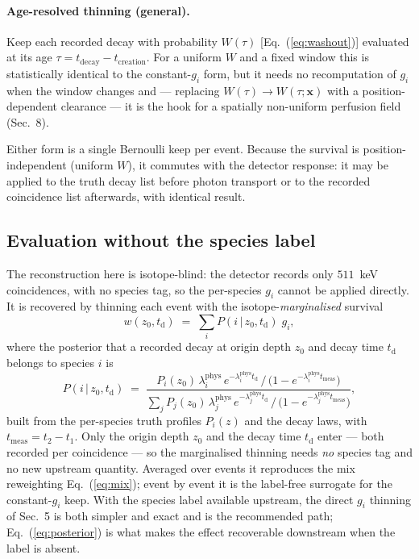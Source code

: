 \documentclass[11pt]{article}
\begin{document}
\paragraph{Age-resolved thinning (general).}
Keep each recorded decay with probability $W(\tau)$ [Eq.~(\ref{eq:washout})]
evaluated at its age $\tau=t_{\mathrm{decay}}-t_{\mathrm{creation}}$. For a uniform
$W$ and a fixed window this is statistically identical to the constant-$g_i$ form,
but it needs no recomputation of $g_i$ when the window changes and ---
replacing $W(\tau)\to W(\tau;\mathbf{x})$ with a position-dependent clearance ---
it is the hook for a spatially non-uniform perfusion field (Sec.~8).

Either form is a single Bernoulli keep per event. Because the survival is
position-independent (uniform $W$), it commutes with the detector response: it may
be applied to the truth decay list before photon transport or to the recorded
coincidence list afterwards, with identical result.

\subsection*{Evaluation without the species label}

The reconstruction here is isotope-blind: the detector records only $511$~keV
coincidences, with no species tag, so the per-species $g_i$ cannot be applied
directly. It is recovered by thinning each event with the
isotope-\emph{marginalised} survival
%
\begin{equation}
  w(z_0,t_{\mathrm{d}}) \;=\; \sum_i P(i\,|\,z_0,t_{\mathrm{d}})\; g_i,
  \label{eq:wmarg}
\end{equation}
%
where the posterior that a recorded decay at origin depth $z_0$ and decay time
$t_{\mathrm{d}}$ belongs to species $i$ is
%
\begin{equation}
  P(i\,|\,z_0,t_{\mathrm{d}}) \;=\;
  \frac{P_i(z_0)\,\lambda_i^{\mathrm{phys}}\,
        e^{-\lambda_i^{\mathrm{phys}} t_{\mathrm{d}}}\,\big/\,
        \bigl(1-e^{-\lambda_i^{\mathrm{phys}} t_{\mathrm{meas}}}\bigr)}
       {\sum_j P_j(z_0)\,\lambda_j^{\mathrm{phys}}\,
        e^{-\lambda_j^{\mathrm{phys}} t_{\mathrm{d}}}\,\big/\,
        \bigl(1-e^{-\lambda_j^{\mathrm{phys}} t_{\mathrm{meas}}}\bigr)},
  \label{eq:posterior}
\end{equation}
%
built from the per-species truth profiles $P_i(z)$ and the decay laws, with
$t_{\mathrm{meas}}=t_2-t_1$. Only the origin depth $z_0$ and the decay time
$t_{\mathrm{d}}$ enter --- both recorded per coincidence --- so the marginalised
thinning needs \emph{no} species tag and no new upstream quantity. Averaged over
events it reproduces the mix reweighting Eq.~(\ref{eq:mix}); event by event it is
the label-free surrogate for the constant-$g_i$ keep. With the species label
available upstream, the direct $g_i$ thinning of Sec.~5 is both simpler and exact
and is the recommended path; Eq.~(\ref{eq:posterior}) is what makes the effect
recoverable downstream when the label is absent.
\end{document}
